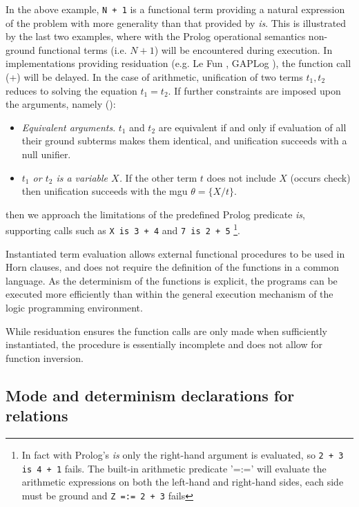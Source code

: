 In the above example, \texttt{N + 1} is a functional term providing a natural expression
of the problem with more generality than that provided by \textit{is}.
This is illustrated by the last two examples, where with the Prolog operational semantics
non-ground functional terms (i.e. $N + 1$) will be encountered during execution.  In implementations
providing residuation (e.g. Le Fun \cite{AKLN87}, GAPLog \cite{MBB+93}),
the function call (+) will be delayed.  In the case of arithmetic, unification of 
two terms $t_1, t_2$ reduces to solving the equation $t_1 = t_2$. If further constraints are
imposed upon the arguments, namely (\cite{MBB+93}):
\begin{itemize}
\item{\textit{Equivalent arguments}. $t_1$ and $t_2$ are equivalent if and only if evaluation of
  all their ground subterms makes them identical, and unification succeeds with a null unifier.}
\item{\textit{$t_1$ or $t_2$ is a variable $X$.}  If the other term $t$ does not include $X$ (occurs
  check) then unification succeeds with the mgu $\theta = \{X/t\}$.}
\end{itemize}
then we approach the limitations of the predefined Prolog predicate \textit{is},
supporting calls such as
\texttt{X is 3 + 4} and \texttt{7 is 2 + 5}
\footnote{In fact with Prolog's \textit{is} 
  only the right-hand argument is evaluated, so \texttt{2 + 3 is 4 + 1} fails.
  The built-in arithmetic predicate '=:=' will evaluate the arithmetic 
  expressions on both the left-hand and right-hand sides, each side
  must be ground and \texttt{Z =:= 2 + 3} fails}.

Instantiated term evaluation allows external functional procedures to be used in Horn clauses,
and does not require the definition of the functions in a common language.  As the determinism of
the functions is explicit, the programs can be executed more efficiently than within the
general execution mechanism of the logic programming environment.

While residuation
ensures the function calls are only made when sufficiently instantiated, the procedure is
essentially incomplete and does not allow for function inversion.

\subsection{Mode and determinism declarations for relations}
\label{modes}

